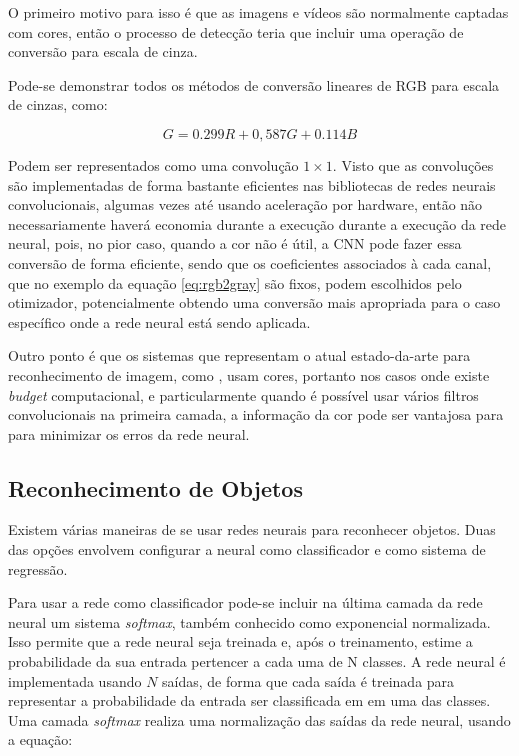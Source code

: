 O primeiro motivo para isso é que as imagens e vídeos são normalmente
captadas com cores, então o processo de detecção teria que incluir uma operação
de conversão para escala de cinza. 

Pode-se demonstrar todos os métodos de conversão lineares de RGB para escala de
cinzas, como:

\begin{equation} \label{eq:rgb2gray}
	G=0.299R + 0,587G + 0.114B
\end{equation}

Podem ser representados como uma convolução $1 \times 1$. Visto que as
convoluções são implementadas de forma bastante eficientes nas bibliotecas
de redes neurais convolucionais, algumas vezes até usando aceleração por
hardware, então não necessariamente haverá economia durante a execução
durante a execução da rede neural, pois, no pior caso, quando a cor não
é útil, a CNN pode fazer
essa conversão de forma eficiente, sendo que os coeficientes associados
à cada canal, que no exemplo da equação \ref{eq:rgb2gray} são fixos, podem
escolhidos pelo otimizador, potencialmente obtendo uma conversão mais
apropriada para o caso específico onde a rede neural está sendo aplicada.

Outro ponto é que os sistemas que representam o atual
estado-da-arte para reconhecimento de imagem, como \cite{szegedy2015going}
\cite{hasanpour2016lets}, usam cores, portanto nos casos onde
existe \emph{budget} computacional, e particularmente quando é possível usar
vários filtros convolucionais na primeira camada, a informação da cor pode
ser vantajosa para para minimizar os erros da rede neural.

\subsection{Reconhecimento de Objetos}
Existem várias maneiras de se usar redes neurais para reconhecer objetos. Duas
das opções envolvem configurar a neural como classificador e como sistema de
regressão.

Para usar a rede como classificador pode-se incluir na última camada da rede
neural um sistema \emph{softmax}, também conhecido como exponencial
normalizada. Isso
permite que a rede neural seja treinada e, após o treinamento, estime a
probabilidade da sua entrada pertencer a cada uma de N classes. A rede neural é
implementada usando $N$ saídas, de forma que cada saída é treinada para
representar a probabilidade da entrada ser classificada em em uma das classes.
Uma camada \emph{softmax} realiza uma normalização das saídas da rede neural,
usando a equação:

